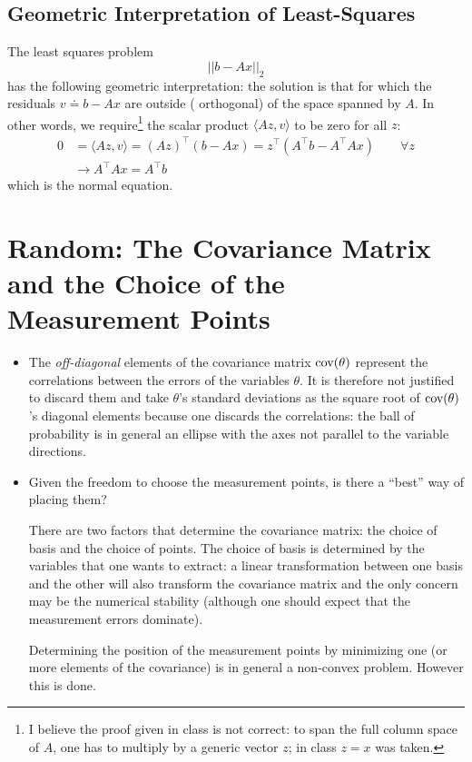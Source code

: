 \subsection{Geometric Interpretation of Least-Squares}

The least squares problem
\begin{equation*}
  ||b - Ax||_2
\end{equation*}
has the following geometric interpretation: the solution is that for which the residuals $v \doteq b - Ax$ are outside ( orthogonal) of the space spanned by $A$.
In other words, we require\footnote{I believe the proof given in class is not correct: to span the full column space of $A$, one has to multiply by a generic vector $z$; in class $z=x$ was taken.} the scalar product $\langle Az, v\rangle$ to be zero for all $z$:
\begin{align*}
  0 &= \langle Az, v\rangle = (Az)^\top(b-Ax) = z^\top \left(A^\top b - A^\top Ax\right)\hspace{2em}\forall z \\
    &\rightarrow A^\top Ax = A^\top b
\end{align*}
which is the normal equation.


\section{Random: The Covariance Matrix and the Choice of the Measurement Points}
\label{question-covariance}

\begin{itemize}
\item The \emph{off-diagonal} elements of the covariance matrix $\textrm{cov}(\theta)$ represent the correlations between the errors of the variables $\theta$.
It is therefore not justified to discard them and take $\theta$'s standard deviations as the square root of $\textrm{cov}(\theta)$'s diagonal elements because one discards the correlations: the ball of probability is in general an ellipse with the axes not parallel to the variable directions.

\item Given the freedom to choose the measurement points, is there a ``best'' way of placing them?

  There are two factors that determine the covariance matrix: the choice of basis and the choice of points.
  The choice of basis is determined by the variables that one wants to extract: a linear transformation between one basis and the other will also transform the covariance matrix and the only concern may be the numerical stability (although one should expect that the measurement errors dominate).

  Determining the position of the measurement points by minimizing one (or more elements of the covariance) is in general a non-convex problem. However this is done.
\end{itemize}

